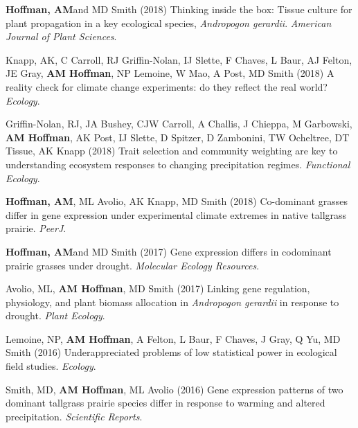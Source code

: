 \documentclass{cv}
\begin{document}
\begin{pubenum}
\item\textbf{Hoffman, AM}\footnotemark[1] and MD Smith (2018) Thinking inside the box: Tissue culture for plant propagation in a key ecological species, \textit{Andropogon gerardii}. \textit{American Journal of Plant Sciences}.  

\item Knapp, AK, C Carroll, RJ Griffin-Nolan, IJ Slette, F Chaves, L Baur, AJ Felton, JE Gray, \textbf{AM Hoffman}, NP Lemoine, W Mao, A Post, MD Smith (2018) A reality check for climate change experiments: do they reflect the real world? \textit{Ecology}. 

\item Griffin-Nolan, RJ, JA Bushey, CJW Carroll, A Challis, J Chieppa, M Garbowski, \textbf{AM Hoffman}, AK Post, IJ Slette, D Spitzer, D Zambonini, TW Ocheltree, DT Tissue, AK Knapp  (2018) Trait selection and community weighting are key to understanding ecosystem responses to changing precipitation regimes. \textit{Functional Ecology}. 

\item\textbf{Hoffman, AM}, ML Avolio, AK Knapp, MD Smith (2018) Co-dominant grasses differ in gene expression under experimental climate extremes in native tallgrass prairie. \textit{PeerJ}. 

\item\textbf{Hoffman, AM}\footnotemark[1] and MD Smith (2017) Gene expression differs in codominant prairie grasses under drought. \textit{Molecular Ecology Resources}. 

\item Avolio, ML, \textbf{AM Hoffman}, MD Smith (2017) Linking gene regulation, physiology, and plant biomass allocation in \textit{Andropogon gerardii} in response to drought. \textit{Plant Ecology}. 

\item Lemoine, NP, \textbf{AM Hoffman}, A Felton, L Baur, F Chaves, J Gray, Q Yu, MD Smith (2016) Underappreciated problems of low statistical power in ecological field studies. \textit{Ecology}. 

\item Smith, MD, \textbf{AM Hoffman}, ML Avolio (2016) Gene expression patterns of two dominant tallgrass prairie species differ in response to warming and altered precipitation. \textit{Scientific Reports}. 


\end{pubenum}
\end{document}
